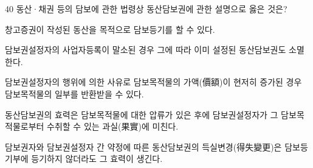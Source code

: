 \begin{question}{40}
동산·채권 등의 담보에 관한 법령상 동산담보권에 관한 설명으로 옳은 것은?
\begin{choices}
  \item 창고증권이 작성된 동산을 목적으로 담보등기를 할 수 있다.
  \item 담보권설정자의 사업자등록이 말소된 경우 그에 따라 이미 설정된 동산담보권도 소멸한다.
  \item 담보권설정자의 행위에 의한 사유로 담보목적물의 가액(價額)이 현저히 증가된 경우 담보목적물의 일부를 반환받을 수 있다.
  \item 동산담보권의 효력은 담보목적물에 대한 압류가 있은 후에 담보권설정자가 그 담보목적물로부터 수취할 수 있는 과실(果實)에 미친다.
  \item 담보권자와 담보권설정자 간 약정에 따른 동산담보권의 득실변경(得失變更)은 담보등기부에 등기하지 않더라도 그 효력이 생긴다.
\end{choices}
\end{question}
